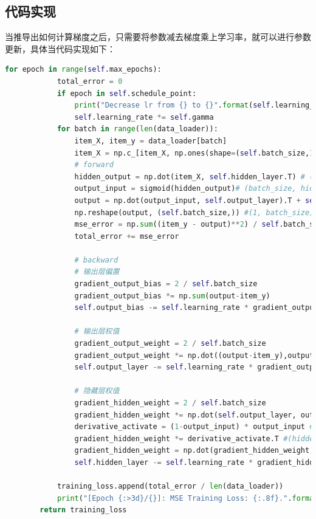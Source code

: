 \documentclass[UTF8]{ctexart}
\begin{document}
\subsection{代码实现}
当推导出如何计算梯度之后，只需要将参数减去梯度乘上学习率，就可以进行参数更新，具体当代码实现如下：
\begin{lstlisting}[language=Python]
    for epoch in range(self.max_epochs):
            total_error = 0
            if epoch in self.schedule_point:
                print("Decrease lr from {} to {}".format(self.learning_rate, self.gamma * self.learning_rate))
                self.learning_rate *= self.gamma
            for batch in range(len(data_loader)):
                item_X, item_y = data_loader[batch]
                item_X = np.c_[item_X, np.ones(shape=(self.batch_size,1))]
                # forward
                hidden_output = np.dot(item_X, self.hidden_layer.T) # (batch_size, hidden_size)
                output_input = sigmoid(hidden_output)# (batch_size, hidden_size)
                output = np.dot(output_input, self.output_layer).T + self.output_bias# (1, batch_size)
                np.reshape(output, (self.batch_size,)) #(1, batch_size)
                mse_error = np.sum((item_y - output)**2) / self.batch_size
                total_error += mse_error
                
                # backward
                # 输出层偏置
                gradient_output_bias = 2 / self.batch_size
                gradient_output_bias *= np.sum(output-item_y)
                self.output_bias -= self.learning_rate * gradient_output_bias
                
                # 输出层权值
                gradient_output_weight = 2 / self.batch_size
                gradient_output_weight *= np.dot((output-item_y),output_input).T #(hidden_size, 1) 
                self.output_layer -= self.learning_rate * gradient_output_weight
                
                # 隐藏层权值
                gradient_hidden_weight = 2 / self.batch_size
                gradient_hidden_weight *= np.dot(self.output_layer, output-item_y) #(hidden_size, batch_size)
                derivative_activate = (1-output_input) * output_input #(batch_size, hidden_size)
                gradient_hidden_weight *= derivative_activate.T #(hidden_size, batch_size)
                gradient_hidden_weight = np.dot(gradient_hidden_weight, item_X) #(hidden, input_length + 1)
                self.hidden_layer -= self.learning_rate * gradient_hidden_weight
            
            training_loss.append(total_error / len(data_loader))
            print("[Epoch {:>3d}/{}]: MSE Training Loss: {:.8f}.".format(epoch + 1, self.max_epochs, total_error / len(data_loader)))
        return training_loss
\end{lstlisting}
\end{document}
